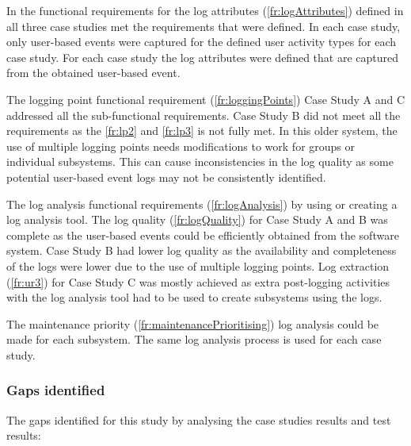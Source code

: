 In  the functional requirements for the log attributes (\ref{fr:logAttributes}) defined in  all three case studies met the requirements that were defined. In each case study, only user-based events were captured for the defined user activity types for each case study. For each case study the log attributes were defined that are captured from the obtained user-based event.\par The logging point functional requirement (\ref{fr:loggingPoints}) Case Study A and C addressed all the sub-functional requirements. Case Study B did not meet all the requirements as the \ref{fr:lp2} and \ref{fr:lp3} is not fully met. In this older system, the use of multiple logging points needs modifications to work for groups or individual subsystems. This can cause inconsistencies in the log quality as some potential user-based event logs may not be consistently identified.\par The log analysis functional requirements (\ref{fr:logAnalysis}) by using or creating a log analysis tool. The log quality (\ref{fr:logQuality}) for Case Study A and B was complete as the user-based events could be efficiently obtained from the software system. Case Study B had lower log quality as the availability and completeness of the logs were lower due to the use of multiple logging points. Log extraction (\ref{fr:ur3}) for Case Study C was mostly achieved as extra post-logging activities with the log analysis tool had to be used to create subsystems using the logs.\par The maintenance priority (\ref{fr:maintenancePrioritising}) log analysis could be made for each subsystem. The same log analysis process is used for each case study.

\subsubsection{Gaps identified}
The gaps identified for this study by analysing the case studies results and test results:

